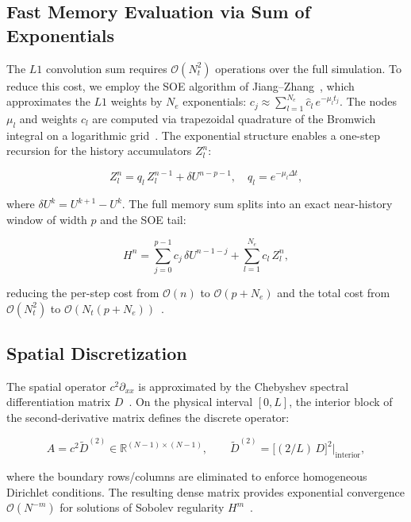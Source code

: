 \documentclass[a4paper,fleqn]{cas-sc}
\begin{document}
\subsection{Fast Memory Evaluation via Sum of Exponentials}\label{sec:soe}

The $L1$ convolution sum requires $\mathcal{O}(N_t^2)$ operations over the full simulation. To reduce this cost, we employ the SOE algorithm of Jiang--Zhang~\cite{ref6}, which approximates the $L1$ weights by $N_e$ exponentials: $c_j \approx \sum_{l=1}^{N_e} \hat{c}_l\, e^{-\mu_l t_j}$. The nodes $\mu_l$ and weights $c_l$ are computed via trapezoidal quadrature of the Bromwich integral on a logarithmic grid~\cite{ref6}. The exponential structure enables a one-step recursion for the history accumulators $Z_l^n$:
\begin{linenomath}
\begin{equation}\label{eq:soe_recursion}
  Z_l^{n} = q_l\,Z_l^{n-1} + \delta U^{n-p-1}, \quad q_l = e^{-\mu_l \Delta t},
\end{equation}
\end{linenomath}
where $\delta U^k = U^{k+1}-U^k$. The full memory sum splits into an exact near-history window of width $p$ and the SOE tail:
\begin{linenomath}
\begin{equation}\label{eq:soe_full}
  H^n = \sum_{j=0}^{p-1} c_j\,\delta U^{n-1-j} + \sum_{l=1}^{N_e} c_l\,Z_l^n,
\end{equation}
\end{linenomath}
reducing the per-step cost from $\mathcal{O}(n)$ to $\mathcal{O}(p + N_e)$ and the total cost from $\mathcal{O}(N_t^2)$ to $\mathcal{O}(N_t(p+N_e))$~\cite{ref11,ref10}.

\subsection{Spatial Discretization}\label{sec:spatial_matrices}
The spatial operator $c^2 \partial_{xx}$ is approximated by the Chebyshev spectral differentiation matrix $D$~\cite{ref5,gottlieb1977}. On the physical interval $[0,L]$, the interior block of the second-derivative matrix defines the discrete operator:
\begin{linenomath}
\begin{equation}\label{eq:spectral_semi}
  A = c^2 \tilde{D}^{(2)} \in \mathbb{R}^{(N-1) \times (N-1)}, \qquad \tilde{D}^{(2)} = \bigl[(2/L)\,D\bigr]^2\big|_{\text{interior}},
\end{equation}
\end{linenomath}
where the boundary rows/columns are eliminated to enforce homogeneous Dirichlet conditions. The resulting dense matrix provides exponential convergence $\mathcal{O}(N^{-m})$ for solutions of Sobolev regularity $H^m$~\cite{ref5}.
\end{document}
